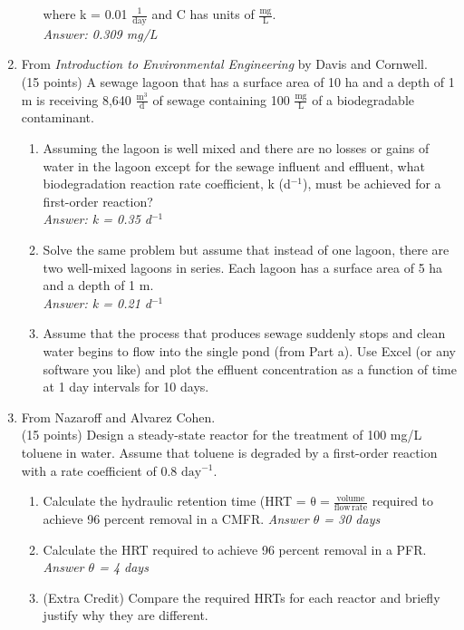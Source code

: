 \documentclass[12pt,letterpaper]{article}
\begin{document}
\begin{enumerate}
\begin{enumerate}
where k = 0.01 $\mathrm{\frac{1}{day}}$ and C has units of $\mathrm{\frac{mg}{L}}$.\\
\emph{Answer: 0.309 mg/L}
\end{enumerate}

\item From \emph{Introduction to Environmental Engineering} by Davis and Cornwell.\\
(15 points) A sewage lagoon that has a surface area of 10 ha and a depth of 1 m is receiving 8,640 $\mathrm{\frac{m^3}{d}}$ of sewage containing 100 $\mathrm{\frac{mg}{L}}$ of a biodegradable contaminant.  
\begin{enumerate}
\item Assuming the lagoon is well mixed and there are no losses or gains of water in the lagoon except for the sewage influent and effluent, what biodegradation reaction rate coefficient, k (d$^{-1}$), must be achieved for a first-order reaction?\\
\emph{Answer: k = 0.35 d$^{-1}$}

\item Solve the same problem but assume that instead of one lagoon, there are two well-mixed lagoons in series.  Each lagoon has a surface area of 5 ha and a depth of 1 m.\\
\emph{Answer: k = 0.21 d$^{-1}$}

\item Assume that the process that produces sewage suddenly stops and clean water begins to flow into the single pond (from Part a).  Use Excel (or any software you like) and plot the effluent concentration as a function of time at 1 day intervals for 10 days. 
 
\end{enumerate}
\item From Nazaroff and Alvarez Cohen.\\
(15 points) Design a steady-state reactor for the treatment of 100 mg/L toluene in water.  Assume that toluene is degraded by a first-order reaction with a rate coefficient of 0.8 $\mathrm{day^{-1}}$.
\begin{enumerate}
\item Calculate the hydraulic retention time (HRT = $\mathrm{\theta = \frac{volume}{flow\, rate}}$ required to achieve 96 percent removal in a CMFR. \emph{Answer $\theta$ = 30 days}
\item Calculate the HRT required to achieve 96 percent removal in a PFR. \emph{Answer $\theta$ = 4 days}
\item (Extra Credit) Compare the required HRTs for each reactor and briefly justify why they are different.
\end{enumerate}
\end{enumerate}
\end{document}
